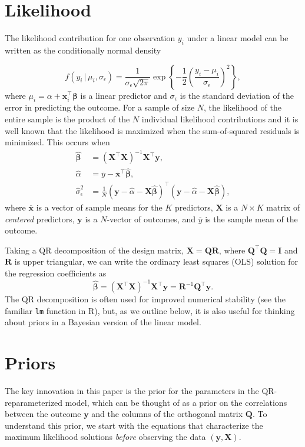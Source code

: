 \documentclass[11pt]{article}
\newcommand{\boldbeta}{\boldsymbol{\beta}}
\newcommand{\hatbeta}{\widehat{\boldbeta}}
\newcommand{\hatalpha}{\widehat{\alpha}}
\newcommand{\sigmaEps}{\sigma_{\epsilon}}
\newcommand{\X}{\mathbf{X}}
\newcommand{\y}{\mathbf{y}}
\newcommand{\Q}{\mathbf{Q}}
\newcommand{\R}{\mathbf{R}}
\begin{document}
\section{Likelihood}

The likelihood contribution for one observation $y_i$ under a linear model
can be written as the conditionally normal density

$$
f \left(y_i \,|\, \mu_i, \sigmaEps \right) = \frac{1}{\sigmaEps \sqrt{2 \pi}}
\exp{\left\{-\frac{1}{2} \left(\frac{y_i - \mu_i}{\sigmaEps}\right)^2\right\}},
$$
%
where $\mu_i = \alpha + \mathbf{x}_i^\top \boldbeta$ is a linear
predictor and $\sigmaEps$ is the standard deviation of the error in predicting
the outcome. For a sample of size $N$, the likelihood of the entire sample is
the product of the $N$ individual likelihood contributions and it is well known
that the likelihood is maximized when the sum-of-squared residuals is minimized.
This occurs when
%
\begin{align*}
\hatbeta &= \left(\X^\top \X \right)^{-1} \X^\top \y,\\
\hatalpha &= \overline{y} - \overline{\mathbf{x}}^\top \hatbeta,\\
\widehat{\sigma}_{\epsilon}^2 &=
  \frac{1}{N}
  \left(\y - \hatalpha - \X \hatbeta \right)^\top
  \left(\y - \hatalpha - \X \hatbeta \right),
\end{align*}
%
where $\overline{\mathbf{x}}$ is a vector of sample means for the
$K$ predictors, $\X$ is a $N \times K$ matrix of \emph{centered} predictors,
$\y$ is a $N$-vector of outcomes, and $\overline{y}$ is the sample mean of the
outcome.

Taking a QR decomposition of the design matrix, $\X = \Q\R$, where
$\Q^\top \Q = \mathbf{I}$ and $\R$ is upper triangular, we can write the
ordinary least squares (OLS) solution for the regression coefficients as
$$\hatbeta = \left(\X^\top \X \right)^{-1} \X^\top \y = \R^{-1} \Q^\top \y.$$
%
The QR decomposition is often used for improved numerical stability (see the
familiar {\tt lm} function in R), but, as we outline below, it is also useful
for thinking about priors in a Bayesian version of the linear model.


\section{Priors}

The key innovation in this paper is the prior for the parameters in the
QR-reparameterized model, which can be thought of as a prior on the correlations
between the outcome $\y$ and the columns of the orthogonal matrix $\Q$. To
understand this prior, we start with the equations that characterize the maximum
likelihood solutions \emph{before} observing the data $\left(\y, \X\right)$.
\end{document}
